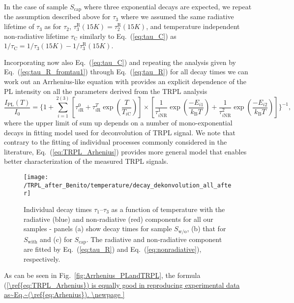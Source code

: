 {{In the case of sample $S_\mathrm{cap}$ where three exponential decays are expected, we repeat the assumption described above for $\tau_3$ where we assumed the same radiative lifetime of $\tau_3$ as for $\tau_2$, $\tau_3^\mathrm{R}(15K)=\tau_2^\mathrm{R}(15K)$, and temperature independent non-radiative lifetime $\tau_\mathrm{C}$ similarly to Eq.~(\ref{eq:tau_C}) as $1 / \tau_\mathrm{C} = 1/ \tau_3(15K)-1/ \tau_3^\mathrm{R}(15K)$.

Incorporating now also Eq.~(\ref{eq:tau_C}) and repeating the analysis given by Eq.~(\ref{eq:tau_R_fromtau1}) through Eq.~(\ref{eq:tau_R}) for all decay times we can work out an Arrhenius-like equation with provides an explicit dependence of the PL intensity on all the parameters derived from the TRPL analysis
%
\begin{equation}
\frac{I_\mathrm{PL}(T)}{I_0}=\Bigg\{ 1+\sum_{i=1}^{2(3)} {\left[\tau_{i\mathrm{R}}^0+\tau_{i\mathrm{R}}^T\exp{\left(\frac{T}{T_{i\mathrm{C}}}\right)}\right] \times \left[\frac{1}{\tau_{i\mathrm{NR}}^1}\exp{\left(\frac{-E_{i1}}{k_\mathrm{B}T}\right)} + \frac{1}{\tau_{i\mathrm{NR}}^2}\exp{\left(\frac{-E_{i2}}{k_\mathrm{B}T}\right)}\right]}\Bigg\}^{-1}, \label{eq:TRPL_Arhenius}
\end{equation}
%
where the upper limit of sum up depends on a number of mono-exponential decays in fitting model used for deconvolution of TRPL signal. We note that contrary to the fitting of individual processes commonly considered in the literature, Eq.~(\ref{eq:TRPL_Arhenius}) provides more general model that enables better characterization of the measured TRPL signals.
%
\begin{figure}
	\centering
	\texttt{[image: /TRPL\_after\_Benito/temperature/decay\_dekonvolution\_all\_after]}
	\caption{Individual decay times $\tau_1$--$\tau_3$ as a function of temperature with the radiative (blue) and non-radiative (red) components for all our samples - panels (a) show decay times for sample $S_\mathrm{w/o}$, (b) that for $S_\mathrm{with}$ and (c) for $S_\mathrm{cap}$. The radiative and non-radiative component are fitted by Eq.~(\ref{eq:tau_R}) and Eq.~(\ref{eq:nonradiative}), respectively.}
	\label{fig:TRPL_temp_decon}
\end{figure}

As can be seen in Fig.~\ref{fig:Arrhenius_PLandTRPL}, the formula (\ref{\ref{eq:TRPL_Arhenius}) is equally good in reproducing experimental data as~Eq.~(\ref{eq:Arhenius}). 


\newpage

}}}
